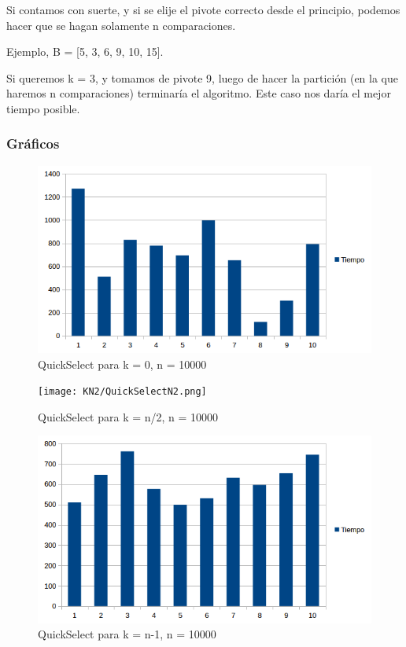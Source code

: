 Si contamos con suerte, y si se elije el pivote correcto desde el principio, podemos hacer que se hagan solamente n comparaciones. 

Ejemplo, B = [5, 3, 6, 9, 10, 15].

Si queremos k = 3, y tomamos de pivote 9, luego de hacer la partición (en la que haremos n comparaciones) terminaría el algoritmo. Este caso nos daría el mejor tiempo posible.

\subsubsection{Gráficos}
\begin{figure}[H]
\centering
\includegraphics[width=\textwidth]{KZero/QuickSelectK0.png}
\caption{QuickSelect para k = 0, n = 10000}
\end{figure}

\begin{figure}[H]
\centering
\texttt{[image: KN2/QuickSelectN2.png]}
\caption{QuickSelect para k = n/2, n = 10000}
\end{figure}

\begin{figure}[H]
\centering
\includegraphics[width=\textwidth]{KN/QuickSelectN.png}
\caption{QuickSelect para k = n-1, n = 10000}
\end{figure}
\newpage

